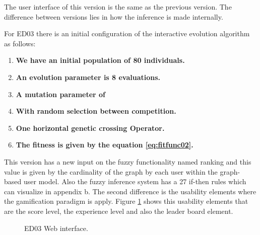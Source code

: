 The user interface of this version is the same as the previous version. The
difference between versions lies in how the inference is made internally.

For ED03 there is an initial configuration of the interactive evolution
algorithm as follows:
\begin{enumerate}
	\item  \textbf{We have an initial population of 80 individuals.}

	\item  \textbf{An evolution parameter is 8 evaluations.}

	\item  \textbf{A mutation parameter of }
	\item  \textbf{With random selection between competition.}
	\item  \textbf{One horizontal genetic crossing Operator.}
	\item  \textbf{The fitness is given by the equation \ref{eq:fitfunc02}.}
\end{enumerate}

This version has a new input on the fuzzy functionality named ranking and this
value is given by the cardinality of the graph by each user within the graph-
based user model. Also the fuzzy inference system has a 27 if-then rules which
can visualize in appendix b. The second difference is the usability elements
where the gamification paradigm is apply. Figure \ref{fig:intarface03} shows this
usability elements that are the score level, the experience level and also the
leader board element.

\begin{figure}
\captionsetup{justification=centering,margin=2cm}
\centering
\setlength\fboxsep{0pt}
\setlength\fboxrule{0.7pt}
\caption{ED03 Web interface.}
\label{fig:intarface03}
\end{figure}

